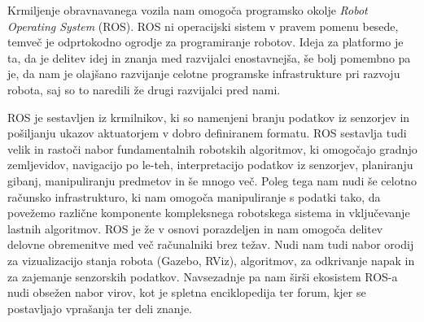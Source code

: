 \documentclass[10pt,a4paper]{article}
\begin{document}

Krmiljenje obravnavanega vozila nam omogoča programsko okolje \textit{Robot Operating System} (ROS). ROS ni operacijski sistem v pravem pomenu besede, temveč je odprtokodno ogrodje za programiranje robotov. Ideja za platformo je ta, da je delitev idej in znanja med razvijalci enostavnejša, še bolj pomembno pa je, da nam je olajšano razvijanje celotne programske infrastrukture pri razvoju robota, saj so to naredili že drugi razvijalci pred nami.

ROS je sestavljen iz krmilnikov, ki so namenjeni branju podatkov iz senzorjev in pošiljanju ukazov aktuatorjem v dobro definiranem formatu. ROS sestavlja tudi velik in rastoči nabor fundamentalnih robotskih algoritmov, ki omogočajo gradnjo zemljevidov, navigacijo po le-teh, interpretacijo podatkov iz senzorjev, planiranju gibanj, manipuliranju predmetov in še mnogo več. Poleg tega nam nudi še celotno računsko infrastrukturo, ki nam omogoča manipuliranje s podatki tako, da povežemo različne komponente kompleksnega robotskega sistema in vključevanje lastnih algoritmov. ROS je že v osnovi porazdeljen in nam omogoča delitev delovne obremenitve med več računalniki brez težav. Nudi nam tudi nabor orodij za vizualizacijo stanja robota (Gazebo, RViz), algoritmov, za odkrivanje napak in za zajemanje senzorskih podatkov. Navsezadnje pa nam širši ekosistem ROS-a nudi obsežen nabor virov, kot je spletna enciklopedija ter forum, kjer se postavljajo vprašanja ter deli znanje.
\end{document}
